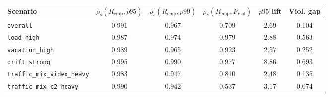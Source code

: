 \begin{tabular}{lccccc}
\hline
Scenario & $\rho_s(R_{\mathrm{emp}},p95)$ & $\rho_s(R_{\mathrm{emp}},p99)$ & $\rho_s(R_{\mathrm{emp}},P_{\mathrm{viol}})$ & $p95$ lift & Viol. gap \\
\hline
\texttt{overall} & 0.991 & 0.967 & 0.709 & 2.69 & 0.104 \\
\texttt{load\_high} & 0.987 & 0.974 & 0.979 & 2.88 & 0.563 \\
\texttt{vacation\_high} & 0.989 & 0.965 & 0.923 & 2.57 & 0.252 \\
\texttt{drift\_strong} & 0.995 & 0.990 & 0.977 & 8.86 & 0.693 \\
\texttt{traffic\_mix\_video\_heavy} & 0.983 & 0.947 & 0.810 & 2.48 & 0.135 \\
\texttt{traffic\_mix\_c2\_heavy} & 0.990 & 0.942 & 0.537 & 3.17 & 0.074 \\
\hline
\end{tabular}
